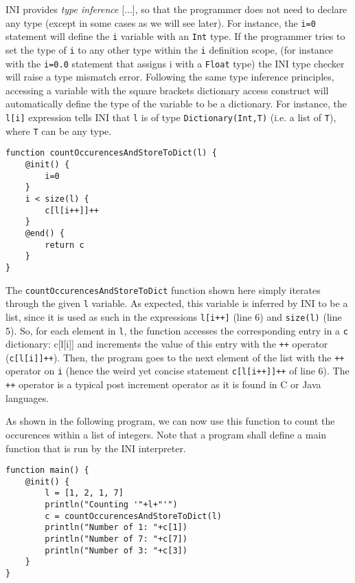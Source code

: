\documentclass[11pt]{report}
\begin{document}
INI provides \emph{type inference} [...], so that the programmer does not need to declare any type (except in some cases as we will see later). For instance, the \texttt{i=0} statement will define the \texttt{i} variable with an \texttt{Int} type. If the programmer tries to set the type of \texttt{i} to any other type within the \texttt{i} definition scope, (for instance with the \texttt{i=0.0} statement that assigns i with a \texttt{Float} type) the INI type checker will raise a type mismatch error. Following the same type inference principles, accessing a variable with the square brackets dictionary access construct will automatically define the type of the variable to be a dictionary. For instance, the \texttt{l[i]} expression tells INI that \texttt{l} is of type \texttt{Dictionary(Int,T)} (i.e. a list of \texttt{T}), where \texttt{T} can be any type.

\begin{lstlisting}
function countOccurencesAndStoreToDict(l) {
	@init() {
		i=0
	}
	i < size(l) {
		c[l[i++]]++
	}
	@end() {
		return c
	}
}
\end{lstlisting}

The \texttt{countOccurencesAndStoreToDict} function shown here simply iterates through the given \texttt{l} variable. As expected, this variable is inferred by INI to be a list, since it is used as such in the expressions \texttt{l[i++]} (line 6) and \texttt{size(l)} (line 5). So, for each element in \texttt{l}, the function accesses the corresponding entry in a \texttt{c} dictionary: c[l[i]] and increments the value of this entry with the \texttt{++} operator (\texttt{c[l[i]]++}). Then, the program goes to the next element of the list with the \texttt{++} operator on \texttt{i} (hence the weird yet concise statement \texttt{c[l[i++]]++} of line 6). The \texttt{++} operator is a typical post increment operator as it is found in C or Java languages.

As shown in the following program, we can now use this function to count the occurences within a list of integers. Note that a program shall define a main function that is run by the INI interpreter.

\begin{lstlisting}
function main() {
	@init() {
		l = [1, 2, 1, 7]
		println("Counting '"+l+"'")
		c = countOccurencesAndStoreToDict(l)
		println("Number of 1: "+c[1])
		println("Number of 7: "+c[7])
		println("Number of 3: "+c[3])
	}
}
\end{lstlisting}
\end{document}
